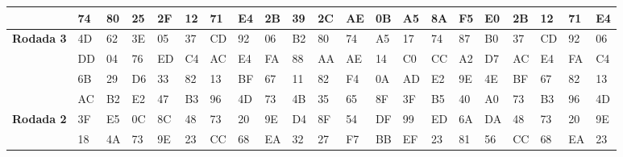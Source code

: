 \documentclass[
    article,            %
    11pt,               %
    oneside,            %
    a4paper,            %
    english,            %
    brazil,             %
    sumario=tradicional,
    ]{abntex2}
\begin{document}
\begin{table}[H]
{\begin{tabular}{|
>{\columncolor[HTML]{C0C0C0}}l |llll|llll|llll|llll|llll|}
\textbf{}          & 74              & 80              & 25              & 2F              & 12             & 71             & E4            & 2B            & 39             & 2C            & AE            & 0B            & A5              & 8A             & F5             & E0             & 2B             & 12             & 71             & E4            \\ \hline
\textbf{Rodada 3}  & 4D              & 62              & 3E              & 05              & 37             & CD             & 92            & 06            & B2             & 80            & 74            & A5            & 17              & 74             & 87             & B0             & 37             & CD             & 92             & 06            \\
\textbf{}          & DD              & 04              & 76              & ED              & C4             & AC             & E4            & FA            & 88             & AA            & AE            & 14            & C0              & CC             & A2             & D7             & AC             & E4             & FA             & C4            \\
\textbf{}          & 6B              & 29              & D6              & 33              & 82             & 13             & BF            & 67            & 11             & 82            & F4            & 0A            & AD              & E2             & 9E             & 4E             & BF             & 67             & 82             & 13            \\
\textbf{}          & AC              & B2              & E2              & 47              & B3             & 96             & 4D            & 73            & 4B             & 35            & 65            & 8F            & 3F              & B5             & 40             & A0             & 73             & B3             & 96             & 4D            \\ \hline
\textbf{Rodada 2}  & 3F              & E5              & 0C              & 8C              & 48             & 73             & 20            & 9E            & D4             & 8F            & 54            & DF            & 99              & ED             & 6A             & DA             & 48             & 73             & 20             & 9E            \\
\textbf{}          & 18              & 4A              & 73              & 9E              & 23             & CC             & 68            & EA            & 32             & 27            & F7            & BB            & EF              & 23             & 81             & 56             & CC             & 68             & EA             & 23            \\

\end{tabular}}
\end{table}
\end{document}
